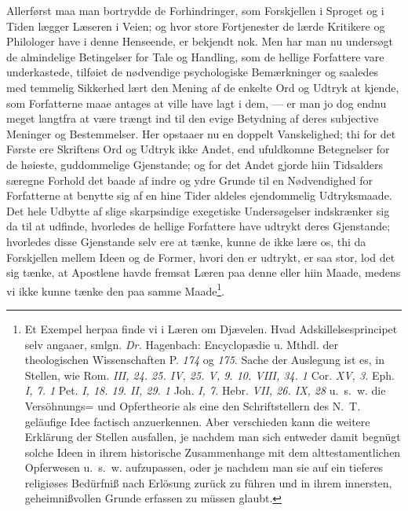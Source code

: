 \documentclass[12pt]{book}
\newcommand{\opage}[1]{\marginnote{\footnotesize\textit{[#1]}}}
\begin{document}
Allerførst maa man bortrydde de Forhindringer, som Forskjellen i Sproget og i
Tiden lægger Læseren i Veien; og hvor store Fortjenester de lærde Kritikere og
Philologer have i denne Henseende, er bekjendt nok. Men har man nu undersøgt
de almindelige Betingelser for Tale og Handling, som de hellige Forfattere
vare underkastede, tilføiet de nødvendige psychologiske Bemærkninger og
saaledes med temmelig Sikkerhed lært den Mening af de enkelte Ord og Udtryk at
kjende,
\opage{109} \setcounter{footnote}{0}%
som Forfatterne maae antages at ville have lagt i dem, --- er man jo dog endnu
meget langtfra at være trængt ind til den evige Betydning af deres subjective
Meninger og Bestemmelser. Her opstaaer nu en doppelt Vanskelighed; thi for det
Første ere Skriftens Ord og Udtryk ikke Andet, end ufuldkomne Betegnelser for
de høieste, guddommelige Gjenstande; og for det Andet gjorde hiin Tidsalders
særegne Forhold det baade af indre og ydre Grunde til en Nødvendighed for
Forfatterne at benytte sig af en hine Tider aldeles ejendommelig Udtryksmaade.
Det hele Udbytte af slige skarpsindige exegetiske Undersøgelser indskrænker sig
da til at udfinde, hvorledes de hellige Forfattere have udtrykt deres
Gjenstande; hvorledes disse Gjenstande selv ere at tænke, kunne de ikke lære
os, thi da Forskjellen mellem Ideen og de Former, hvori den er udtrykt, er saa
stor, lod det sig tænke, at Apostlene havde fremsat Læren paa denne eller hiin
Maade, medens vi ikke kunne tænke den paa samme
Maade\footnote{Et Exempel herpaa finde vi i Læren om Djævelen. Hvad
Adskillelsesprincipet selv angaaer, smlgn. \textit{Dr.} Hagenbach:
Encyclopædie u. Mthdl. der theologischen Wissenschaften P. \textit{174} og
\textit{175}. Sache der Auslegung ist es, in Stellen, wie Rom. \textit{III,
24. 25. IV, 25. V, 9. 10. VIII, 34. 1} Cor. \textit{XV, 3.} Eph. \textit{I, 7.
1} Pet. \textit{I, 18. 19. II, 29. 1} Joh. \textit{I, 7.} Hebr. \textit{VII,
26. IX, 28} u.~s.~w. die Versöhnungs= und Opfertheorie als eine den
Schriftstellern des N.~T. geläufige Idee factisch anzuerkennen. Aber
verschieden kann die weitere Erklärung der Stellen ausfallen, je nachdem man
sich entweder damit begnügt solche Ideen in ihrem historische Zusammenhange
mit dem alttestamentlichen Opferwesen u.~s.~w. aufzupassen, oder je nachdem
man sie auf ein tieferes religiøses Bedürfniß nach Erlösung zurück zu führen
und in ihrem innersten, geheimnißvollen Grunde erfassen zu müssen glaubt.}.
\end{document}
